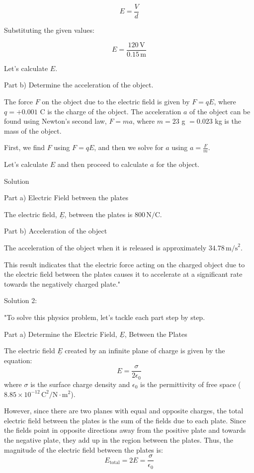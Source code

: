 \[ E = \frac{V}{d} \]

Substituting the given values:

\[ E = \frac{120 \, \text{V}}{0.15 \, \text{m}} \]

Let's calculate \( E \).

Part b) Determine the acceleration of the object.

The force \( F \) on the object due to the electric field is given by \( F = qE \), where \( q = +0.001 \) C is the charge of the object. The acceleration \( a \) of the object can be found using Newton's second law, \( F = ma \), where \( m = 23 \) g \( = 0.023 \) kg is the mass of the object.

First, we find \( F \) using \( F = qE \), and then we solve for \( a \) using \( a = \frac{F}{m} \).

Let's calculate \( E \) and then proceed to calculate \( a \) for the object.

Solution

Part a) Electric Field between the plates

The electric field, \( \underline{E} \), between the plates is \( 800 \, \text{N/C} \).

Part b) Acceleration of the object

The acceleration of the object when it is released is approximately \( 34.78 \, \text{m/s}^2 \). 

This result indicates that the electric force acting on the charged object due to the electric field between the plates causes it to accelerate at a significant rate towards the negatively charged plate."

Solution 2: 

"To solve this physics problem, let's tackle each part step by step.

Part a) Determine the Electric Field, \( \underline{E} \), Between the Plates

The electric field \( \underline{E} \) created by an infinite plane of charge is given by the equation:
\[ E = \frac{\sigma}{2 \epsilon_0} \]
where \( \sigma \) is the surface charge density and \( \epsilon_0 \) is the permittivity of free space (\( 8.85 \times 10^{-12} \, \text{C}^2/\text{N}\cdot\text{m}^2 \)).

However, since there are two planes with equal and opposite charges, the total electric field between the plates is the sum of the fields due to each plate. Since the fields point in opposite directions away from the positive plate and towards the negative plate, they add up in the region between the plates. Thus, the magnitude of the electric field between the plates is:
\[ E_{\text{total}} = 2E = \frac{\sigma}{\epsilon_0} \]

